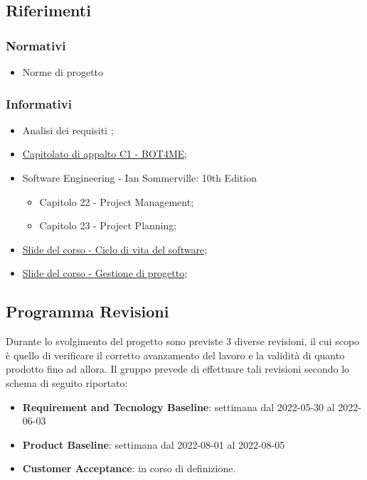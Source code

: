 \subsection{Riferimenti}

\subsubsection{Normativi}
\begin{itemize}
    \item Norme di progetto {\docVersionNdP}
\end{itemize}

\subsubsection{Informativi}
\begin{itemize}
    \item Analisi dei requisiti {\docVersionAdR};
    \item  \href{https://www.math.unipd.it/~tullio/IS-1/2021/Progetto/C1.pdf}{\color{blue} Capitolato di appalto C1 - BOT4ME};
    \item Software Engineering - Ian Sommerville: 10th Edition
    \begin{itemize}
        \item Capitolo 22 - Project Management;
        \item Capitolo 23 - Project Planning;
    \end{itemize}
    \item \href{https://www.math.unipd.it/~tullio/IS-1/2021/Dispense/T05.pdf}{\color{blue} Slide del corso - Ciclo di vita del software};
    \item \href{https://www.math.unipd.it/~tullio/IS-1/2021/Dispense/T06.pdf}{\color{blue} Slide del corso - Gestione di progetto};
\end{itemize}

\subsection{Programma Revisioni}
Durante lo svolgimento del progetto sono previste 3 diverse revisioni, il cui scopo è quello di verificare il corretto avanzamento del lavoro e la validità di quanto prodotto fino ad allora. 
Il gruppo prevede di effettuare tali revisioni secondo lo schema di seguito riportato: 
\begin{itemize}
    \item \textbf{Requirement and Tecnology Baseline}: settimana dal 2022-05-30 al 2022-06-03
    \item \textbf{Product Baseline}: settimana dal 2022-08-01 al 2022-08-05
    \item \textbf{Customer Acceptance}: in corso di definizione.
\end{itemize}
\newpage
